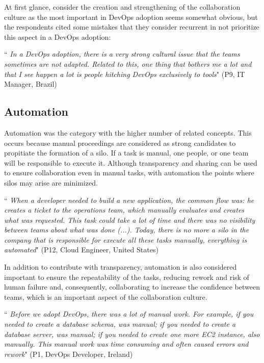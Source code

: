 At first glance, consider the creation and strengthening of the collaboration
culture as the most important in DevOps adoption seems somewhat obvious, but
the respondents cited some mistakes that they consider recurrent in not
prioritize this aspect in a DevOps adoption:

\begin{mq}
``\emph{
In a DevOps adoption, there is a very strong cultural issue that the teams
sometimes are not adapted. Related to this, one thing that bothers me a lot and
that I see happen a lot is people hitching DevOps exclusively to tools}" (P9, IT
Manager, Brazil)
\end{mq}


\subsection{Automation} \label{ssec:automation}
Automation was the category with the higher number of related concepts. This
occurs because manual proceedings are considered as strong candidates to
propitiate the formation of a silo. If a task is manual, one people, or one
team will be responsible to execute it. Although transparency and sharing can
be used to ensure collaboration even in manual tasks, with automation the
points where silos may arise are minimized.

\begin{mq}
``\emph{
When a developer needed to build a new application, the common flow was: he
creates a ticket to the operations team, which manually evaluates and creates
what was requested. This task could take a lot of time and there was no
visibility between teams about what was done (...). Today, there is no more a
silo in the company that is responsible for execute all these tasks manually,
everything is automated}" (P12, Cloud Engineer, United States)
\end{mq}

In addition to contribute with transparency, automation is also considered
important to ensure the repeatability of the tasks, reducing rework and risk of
human failure and, consequently, collaborating to increase the confidence
between teams, which is an important aspect of the collaboration culture.

\begin{mq}
``\emph{
Before we adopt DevOps, there was a lot of manual work. For example, if you
needed to create a database schema, was manual; if you needed to create a
database server, was manual; if you needed to create one more EC2 instance,
also manually. This manual work was time consuming and often caused errors and
rework}" (P1, DevOps Developer, Ireland)
\end{mq}

